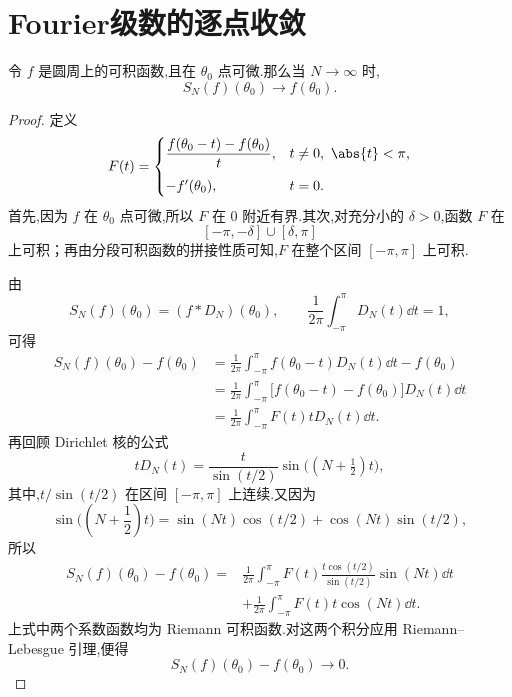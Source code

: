 \section{Fourier级数的逐点收敛}

\begin{theorem}
	令 $f$ 是圆周上的可积函数,且在 $\theta_0$ 点可微.那么当 $N\to\infty$ 时,
	\[
	S_N(f)(\theta_0)\longrightarrow f(\theta_0).
	\]
\end{theorem}

\begin{proof}
	定义
	\[
	F(t)=
	\begin{cases}
		\displaystyle\frac{f(\theta_0-t)-f(\theta_0)}{t},
		& t\neq0,\ \abs{t}<\pi,\\[3mm]
		-f'(\theta_0),&t=0.
	\end{cases}
	\]
	首先,因为 $f$ 在 $\theta_0$ 点可微,所以 $F$ 在 $0$ 附近有界.其次,对充分小的 $\delta>0$,函数 $F$ 在
	\[
	[-\pi,-\delta]\cup[\delta,\pi]
	\]
	上可积；再由分段可积函数的拼接性质可知,$F$ 在整个区间 $[-\pi,\pi]$ 上可积.
	
	由
	\[
	S_N(f)(\theta_0)=(f\ast D_N)(\theta_0),
	\qquad
	\frac1{2\pi}\int_{-\pi}^{\pi}D_N(t)\dd t=1,
	\]
	可得
	\[
	\begin{aligned}
		S_N(f)(\theta_0)-f(\theta_0)
		&=\frac1{2\pi}\int_{-\pi}^{\pi}f(\theta_0-t)D_N(t)\dd t-f(\theta_0)\\
		&=\frac1{2\pi}\int_{-\pi}^{\pi}
		\bigl[f(\theta_0-t)-f(\theta_0)\bigr]D_N(t)\dd t\\
		&=\frac1{2\pi}\int_{-\pi}^{\pi}F(t)tD_N(t)\dd t.
	\end{aligned}
	\]
	再回顾 Dirichlet 核的公式
	\[
	tD_N(t)
	=\frac{t}{\sin(t/2)}
	\sin\bigl((N+\tfrac12)t\bigr),
	\]
	其中,$t/\sin(t/2)$ 在区间 $[-\pi,\pi]$ 上连续.又因为
	\[
	\sin\bigl((N+\dfrac12)t\bigr)
	=\sin(Nt)\cos(t/2)+\cos(Nt)\sin(t/2),
	\]
	所以
	\[
	\begin{aligned}
		S_N(f)(\theta_0)-f(\theta_0)
		={}&\frac1{2\pi}\int_{-\pi}^{\pi}
		F(t)\frac{t\cos(t/2)}{\sin(t/2)}\sin(Nt)\dd t\\
		&+\frac1{2\pi}\int_{-\pi}^{\pi}F(t)t\cos(Nt)\dd t.
	\end{aligned}
	\]
	上式中两个系数函数均为 Riemann 可积函数.对这两个积分应用 Riemann--Lebesgue 引理,便得
	\[
	S_N(f)(\theta_0)-f(\theta_0)\longrightarrow0.
	\]
\end{proof}

